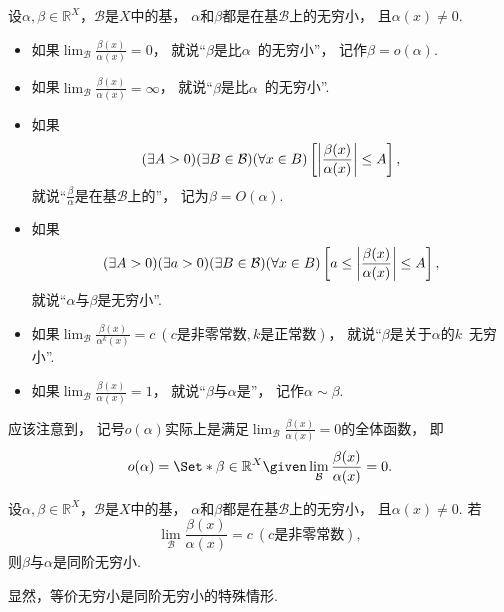 \begin{definition}
设\(\alpha,\beta\in\mathbb{R}^X\)，\(\mathcal{B}\)是\(X\)中的基，
\(\alpha\)和\(\beta\)都是在基\(\mathcal{B}\)上的无穷小，
且\(\alpha(x)\neq0\).
\newcommand{\lf}[1][]{\lim_\mathcal{B} \frac{\beta(x)}{\alpha^{#1}(x)}}
\begin{itemize}
	\item 如果\(\lf=0\)，
	就说“\(\beta\)是比\(\alpha\)~的无穷小”，
	记作\(\beta=o(\alpha)\).

	\item 如果\(\lf=\infty\)，
	就说“\(\beta\)是比\(\alpha\)~的无穷小”.

	\item 如果\[
		(\exists A>0)
		(\exists B\in\mathcal{B})
		(\forall x\in B)
		\left[
			\abs{\frac{\beta(x)}{\alpha(x)}} \leq A
		\right],
	\]
	就说“\(\frac\beta\alpha\)是在基\(\mathcal{B}\)上的”，
	记为\(\beta = O(\alpha)\).

	\item 如果\[
		(\exists A>0)
		(\exists a>0)
		(\exists B\in\mathcal{B})
		(\forall x\in B)
		\left[
			a \leq \abs{\frac{\beta(x)}{\alpha(x)}} \leq A
		\right],
	\]
	就说“\(\alpha\)与\(\beta\)是无穷小”.

	\item 如果\(\lf[k]=c\ (\text{$c$是非零常数},\text{$k$是正常数})\)，
	就说“\(\beta\)是关于\(\alpha\)的\(k\)~无穷小”.

	\item 如果\(\lf=1\)，
	就说“\(\beta\)与\(\alpha\)是”，
	记作\(\alpha\sim\beta\).
\end{itemize}
\end{definition}

\begin{remark}
应该注意到，
记号\(o(\alpha)\)实际上是满足\(\lim_\mathcal{B} \frac{\beta(x)}{\alpha(x)} = 0\)的全体函数，
即\[
	o(\alpha) = \Set*{ \beta\in\mathbb{R}^X \given \lim_\mathcal{B} \frac{\beta(x)}{\alpha(x)} = 0 }.
\]
\end{remark}

\begin{proposition}
设\(\alpha,\beta\in\mathbb{R}^X\)，\(\mathcal{B}\)是\(X\)中的基，
\(\alpha\)和\(\beta\)都是在基\(\mathcal{B}\)上的无穷小，
且\(\alpha(x)\neq0\).
若\[
	\lim_\mathcal{B} \frac{\beta(x)}{\alpha(x)} = c\ (\text{$c$是非零常数}),
\]
则\(\beta\)与\(\alpha\)是同阶无穷小.
\end{proposition}

\begin{remark}
显然，等价无穷小是同阶无穷小的特殊情形.
\end{remark}
